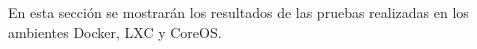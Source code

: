 En esta sección se mostrarán los resultados de las pruebas realizadas en los ambientes Docker, LXC y CoreOS.
